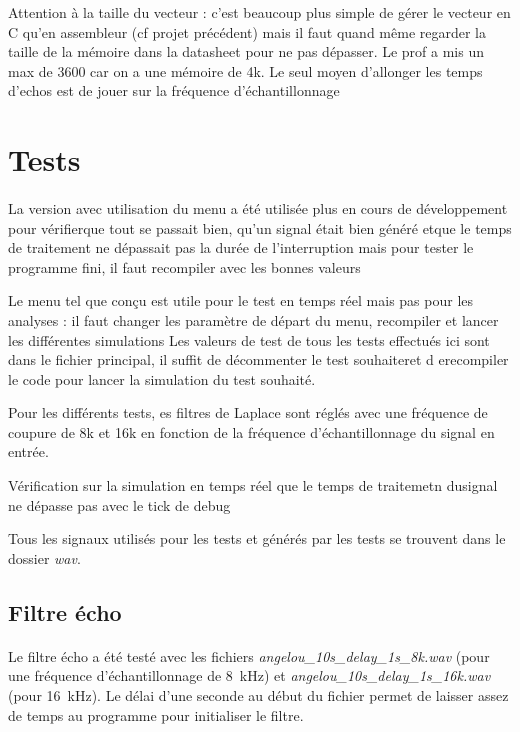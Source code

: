 \documentclass{article}
\begin{document}
    Attention à la taille du vecteur : c'est beaucoup plus simple de gérer le vecteur en C qu'en assembleur (cf projet précédent) mais il faut quand même regarder la taille de la mémoire dans la datasheet pour ne pas dépasser. Le prof a mis un max de 3600 car on a une mémoire de 4k. Le seul moyen d'allonger les temps d'echos est de jouer sur la fréquence d'échantillonnage


    \section{Tests}
    \paragraph{}

    La version avec utilisation du menu a été utilisée plus en cours de développement pour vérifierque tout se passait bien, qu'un signal était bien généré etque le temps de traitement ne dépassait pas la durée de l'interruption mais pour tester le programme fini, il faut recompiler avec les bonnes valeurs

    Le menu tel que conçu est utile pour le test en temps réel mais pas pour les analyses : il faut changer les paramètre de départ du menu, recompiler et lancer les différentes simulations
    Les valeurs de test de tous les tests effectués ici sont dans le fichier principal, il suffit de décommenter le test souhaiteret d erecompiler le code pour lancer la simulation du test souhaité.

    Pour les différents tests, es filtres de Laplace sont réglés avec une fréquence de coupure de 8k et 16k en fonction de la fréquence d'échantillonnage du signal en entrée.

    Vérification sur la simulation en temps réel que le temps de traitemetn dusignal ne dépasse pas avec le tick de debug

    Tous les signaux utilisés pour les tests et générés par les tests se trouvent dans le dossier \emph{wav}.





    \subsection{Filtre écho}
    \paragraph{}
    Le filtre écho a été testé avec les fichiers \emph{angelou\_10s\_delay\_1s\_8k.wav} (pour une fréquence d'échantillonnage de \SI{8}{\kilo\hertz}) et \emph{angelou\_10s\_delay\_1s\_16k.wav} (pour \SI{16}{\kilo\hertz}). Le délai d'une seconde au début du fichier permet de laisser assez de temps au programme pour initialiser le filtre.
\end{document}

